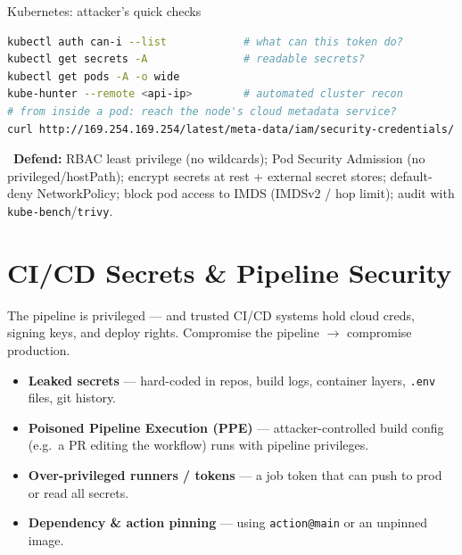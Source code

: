 \documentclass[aspectratio=169,11pt]{beamer}
\newcommand{\defend}[1]{\textcolor{okGreen}{\faLock\ \textbf{Defend:} #1}}
\begin{document}
\begin{frame}[fragile]{Kubernetes: attacker's quick checks}
  \begin{lstlisting}[language=bash]
kubectl auth can-i --list            # what can this token do?
kubectl get secrets -A               # readable secrets?
kubectl get pods -A -o wide
kube-hunter --remote <api-ip>        # automated cluster recon
# from inside a pod: reach the node's cloud metadata service?
curl http://169.254.169.254/latest/meta-data/iam/security-credentials/
  \end{lstlisting}
  \defend{RBAC least privilege (no wildcards); Pod Security Admission
  (no privileged/hostPath); encrypt secrets at rest + external secret stores;
  default-deny NetworkPolicy; block pod access to IMDS (IMDSv2 / hop limit);
  audit with \texttt{kube-bench}/\texttt{trivy}.}
\end{frame}

\section{CI/CD Secrets \& Pipeline Security}
\begin{frame}{The pipeline is privileged --- and trusted}
  CI/CD systems hold cloud creds, signing keys, and deploy rights. Compromise
  the pipeline $\to$ compromise production.
  \begin{itemize}
    \item \textbf{Leaked secrets} --- hard-coded in repos, build logs, container
          layers, \texttt{.env} files, git history.
    \item \textbf{Poisoned Pipeline Execution (PPE)} --- attacker-controlled
          build config (e.g.\ a PR editing the workflow) runs with pipeline
          privileges.
    \item \textbf{Over-privileged runners / tokens} --- a job token that can push
          to prod or read all secrets.
    \item \textbf{Dependency \& action pinning} --- using
          \texttt{action@main} or an unpinned image.
  \end{itemize}
\end{frame}
\end{document}
